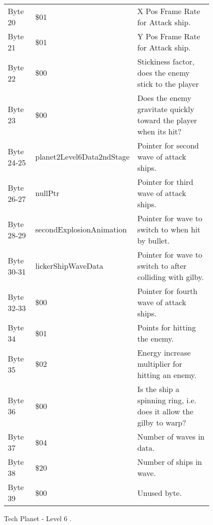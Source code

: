 \begin{figure}[H]
{\begin{adjustbox}{width=12cm}
\begin{tabular}{lll}
 Byte 20    & \$01                       & X Pos Frame Rate for Attack ship.                                   \\
 Byte 21    & \$01                       & Y Pos Frame Rate for Attack ship.                                   \\
 Byte 22    & \$00                       & Stickiness factor, does the enemy stick to the player               \\
 Byte 23    & \$00                       & Does the enemy gravitate quickly toward the player when its hit?    \\
 Byte 24-25 & planet2Level6Data2ndStage & Pointer for second wave of attack ships.                            \\
 Byte 26-27 & nullPtr                   & Pointer for third wave of attack ships.                             \\
 Byte 28-29 & secondExplosionAnimation  & Pointer for wave to switch to when hit by bullet.                   \\
 Byte 30-31 & lickerShipWaveData        & Pointer for  wave to switch to after colliding with gilby.          \\
 Byte 32-33 & \$00                       & Pointer for fourth wave of attack ships.                            \\
 Byte 34    & \$01                       & Points for hitting the enemy.                                       \\
 Byte 35    & \$02                       & Energy increase multiplier for hitting an enemy.                    \\
 Byte 36    & \$00                       & Is the ship a spinning ring, i.e. does it allow the gilby to warp?  \\
 Byte 37    & \$04                       & Number of waves in data.                                            \\
 Byte 38    & \$20                       & Number of ships in wave.                                            \\
 Byte 39    & \$00                       & Unused byte.                                                        \\
\bottomrule
\end{tabular}

  \end{adjustbox}

  }\caption*{Tech Planet - Level 6
.}
\end{figure}

